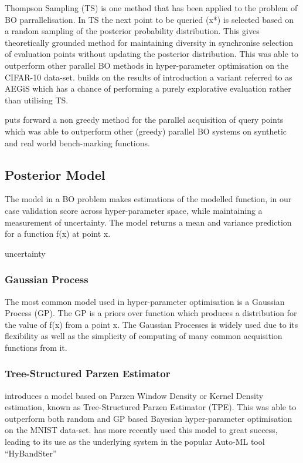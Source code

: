 \documentclass{article}
\begin{document}
Thompson Sampling (TS) is one method that has been applied to the problem of BO parrallelisation\cite{26}\cite{27}. In TS the next point to be queried (x*) is selected based on a random sampling of the posterior probability distribution. This gives theoretically grounded method for maintaining diversity in synchronise selection of evaluation points without updating the posterior distribution. This was able to outperform other parallel BO methods in hyper-parameter optimisation on the CIFAR-10 data-set. 
\cite{26} builds on the results of \cite{27} introduction a variant referred to as AEGiS which has a chance of performing a purely explorative evaluation rather than utilising TS.

 \cite{36} puts forward a non greedy method for the parallel acquisition of query points which was able to outperform other (greedy) parallel BO systems on synthetic and real world bench-marking functions.

\subsection{Posterior Model}

The model in a BO problem makes estimations of the modelled function, in our case validation score across hyper-parameter space, while maintaining a measurement of uncertainty. The model returns a mean and variance prediction for a function f(x) at point x. \cite{35} 

\begin{itemize}
uncertainty

\end{itemize}


\subsubsection{Gaussian Process}

The most common model used in hyper-parameter optimisation is a Gaussian Process (GP)\cite{17}. The GP is a priors over function which produces a distribution for the value of f(x) from a point x. The Gaussian Processes is widely used due to its flexibility as well as the simplicity of computing of many common acquisition functions from it.


\subsubsection{Tree-Structured Parzen Estimator}

\cite{20} introduces a model based on Parzen Window Density or Kernel Density estimation, known as Tree-Structured Parzen Estimator (TPE). This was able to outperform both random and GP based Bayesian hyper-parameter optimisation on the MNIST data-set. \cite{32} has more recently used this model to great success, leading to its use as the underlying system in the popular Auto-ML tool “HyBandSter” \cite{34}
\end{document}
